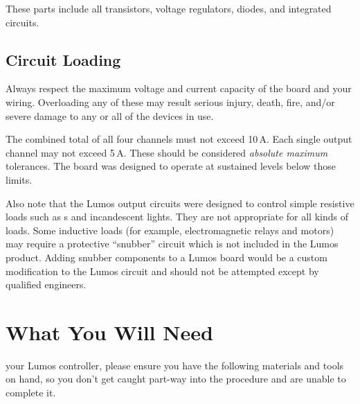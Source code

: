 \documentclass[letterpaper,twoside,onecolumn,openright,final]{memoir}
\begin{document}
These parts include all transistors, voltage regulators, diodes,
and integrated circuits.

\section{Circuit Loading}
Always respect the maximum voltage and current capacity of the board and your wiring.  Overloading any
of these may result serious injury, death, fire, and/or severe damage to any or all of the devices in use.

The combined total of all four channels must not exceed
10\,A.
Each single output channel
may not exceed 5\,A.  These should be considered \emph{absolute maximum} tolerances.  The board was designed
to operate at sustained levels below those limits.

Also note that the Lumos output circuits were designed to control simple resistive loads such as
s and incandescent lights.  They are not appropriate for all kinds of loads.  Some inductive loads
(for example, electromagnetic relays and motors) may require a protective ``snubber'' circuit
which is not included in the Lumos product.  Adding snubber components to a Lumos board would be
a custom modification to the Lumos circuit and should not be attempted except by qualified engineers.

\chapter{What You Will Need}\label{ch:materials}
 your Lumos controller, please ensure
you have the following materials and tools on hand, so you don't get caught part-way
into the procedure and are unable to complete it.
\end{document}
